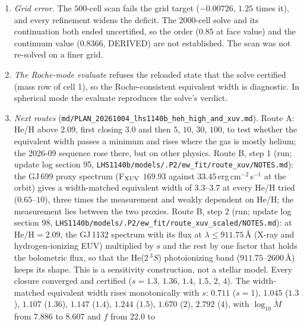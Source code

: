 \documentclass[english,a4paper]{my_memo}
\begin{document}
\begin{enumerate}
      tolerance, the first $1000$-cell run, the $2000$-cell run, and the
      first jump to $0.8$. The accepted state passed it at
      $9.65\times10^{-6}$ against $10^{-5}$. The stall is not diagnosed,
      and no tolerance was loosened.
\item \emph{Grid error.} The $500$-cell scan fails the grid target
      ($-0.00726$, $1.25$ times it), and every refinement widens the
      deficit. The $2000$-cell solve and its continuation both ended
      uncertified, so the order ($0.85$ at face value) and the continuum
      value ($0.8366$, DERIVED) are not established. The scan was not
      re-solved on a finer grid.
\item \emph{The Roche-mode evaluate} refuses the reloaded state that the
      solve certified (mass row of cell 1), so the Roche-consistent
      equivalent width is diagnostic. In spherical mode the evaluate
      reproduces the solve's verdict.
\item \emph{Next routes}
      (\texttt{md/PLAN\_20261004\_lhs1140b\_heh\_high\_and\_xuv.md}).
      Route A: He/H above $2.09$, first closing $3.0$ and then $5$, $10$,
      $30$, $100$, to test whether the equivalent width passes a minimum
      and rises where the gas is mostly helium; the 2026-09 sequence rose
      there, but on other physics.
      Route B, step 1 (run; update log section 95,
      \texttt{LHS1140b/models/.P2/ew\_fit/route\_xuv/NOTES.md}): the
      GJ\,699 proxy spectrum (F$_{\rm XUV}$ $169.93$ against
      $33.45$\,erg\,cm$^{-2}$\,s$^{-1}$ at the orbit) gives a width-matched
      equivalent width of $3.3$--$3.7$ at every He/H tried ($0.65$--$10$),
      three times the measurement and weakly dependent on He/H; the
      measurement lies between the two proxies.
      Route B, step 2 (run; update log section 98,
      \texttt{LHS1140b/models/.P2/ew\_fit/route\_xuv\_scaled/NOTES.md}): at
      $\mathrm{He/H} = 2.09$, the GJ\,1132 spectrum with its flux at
      $\lambda \le 911.75$\,\AA{} (X-ray and hydrogen-ionizing EUV)
      multiplied by $s$ and the rest by one factor that holds the
      bolometric flux, so that the He($2\,^3S$) photoionizing band
      ($911.75$--$2600$\,\AA) keeps its shape. This is a sensitivity
      construction, not a stellar model. Every closure converged and
      certified ($s = 1.3$, $1.36$, $1.4$, $1.5$, $2$, $4$). The
      width-matched equivalent width rises monotonically with $s$:
      $0.711$ ($s = 1$), $1.045$ ($1.3$), $1.107$ ($1.36$), $1.147$
      ($1.4$), $1.244$ ($1.5$), $1.670$ ($2$), $2.792$ ($4$), with
      $\log_{10}\dot M$ from $7.886$ to $8.607$ and $f$ from $22.0$ to

\end{enumerate}
\end{document}
